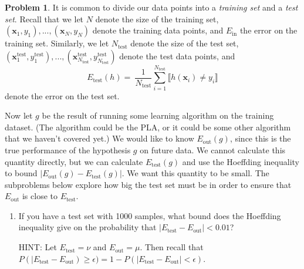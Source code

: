 \documentclass[10pt]{exam}
\theoremstyle{definition}
\newtheorem{problem}{Problem}
\newcommand{\Ein}{E_{\text{in}}}
\newcommand{\Eout}{E_{\text{out}}}
\newcommand{\Etest}{E_{\text{test}}}
\newcommand{\Ntest}{N_{\text{test}}}
\newcommand{\x}{\mathbf x}
\begin{document}

\newpage
\begin{problem}
    It is common to divide our data points into a \emph{training set} and a \emph{test set}.
    Recall that we let $N$ denote the size of the training set, $(\x_1, y_1),...,(\x_N,y_N)$ denote the training data points, and $\Ein$ the error on the training set.
    Similarly, we let $\Ntest$ denote the size of the test set,
    $(\x^{\text{test}}_1, y^{\text{test}}_1), ..., (\x^{\text{test}}_{\Ntest}, y^{\text{test}}_{\Ntest})$ denote the test data points, and
    $$
    \Etest(h) 
    =
    \
    \frac1{\Ntest} \sum_{i=1}^{\Ntest} \llbracket h(\x_i) \ne y_i \rrbracket
    $$
    denote the error on the test set.

    Now let $g$ be the result of running some learning algorithm on the training dataset.
    (The algorithm could be the PLA,
    or it could be some other algorithm that we haven't covered yet.)
    We would like to know $\Eout(g)$,
    since this is the true performance of the hypothesis $g$ on future data.
    We cannot calculate this quantity directly,
    but we can calculate $\Etest(g)$ and use the Hoeffding inequality to bound $|\Eout(g) - \Etest(g)|$.
    We want this quantity to be small.
    The subproblems below explore how big the test set must be in order to ensure that $\Eout$ is close to $\Etest$.
    \begin{enumerate}
        \item If you have a test set with 1000 samples, what bound does the Hoeffding inequality give on the probability that $|\Etest-\Eout| < 0.01$?

            HINT: Let $\Etest=\nu$ and $\Eout=\mu$.  Then recall that $P(|\Etest - \Eout) \ge \epsilon) = 1 - P(|\Etest - \Eout| < \epsilon)$.


\end{enumerate}
\end{problem}
\end{document}

